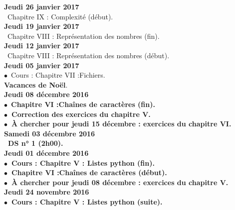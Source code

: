 \documentclass[12pt,a4paper]{article}
\begin{document}
\noindent\textbf{\bf Jeudi 26 janvier 2017 \rm}\\
\bu\ Chapitre IX : Complexité (début).\vspace{.4cm}\\

\noindent\textbf{\bf Jeudi 19 janvier 2017 \rm}\\
\bu\ Chapitre VIII : Représentation des nombres (fin).\vspace{.4cm}\\

\noindent\textbf{\bf Jeudi 12 janvier 2017 \rm}\\
\bu\ Chapitre VIII : Représentation des nombres (début).\vspace{.4cm}\\

\noindent\textbf{\bf Jeudi 05 janvier 2017 \rm}\\
$\bullet$\ Cours : Chapitre VII :\rm Fichiers.\vspace{.4cm}\\
 
\noindent\textbf{\bf Vacances de Noël}.\vspace{.4cm}\\

\noindent\textbf{\bf Jeudi 08 décembre 2016 \rm}\\
$\bullet$\ \bf Chapitre VI :\rm Chaînes de caractères (fin).\\
$\bullet$\ Correction des exercices du chapitre V.\\
$\bullet$\ À chercher pour jeudi 15 décembre : exercices du chapitre VI.
\vspace{.4cm}\\
  
\noindent\textbf{\bf Samedi 03 décembre 2016 \rm}\\
\bu\ DS n° 1 (2h00).\vspace{.4cm}\\

\noindent\textbf{\bf Jeudi 01 décembre 2016 \rm}\\
$\bullet$\ Cours : \bf Chapitre V \rm : Listes python (fin).\\
$\bullet$\ \bf Chapitre VI :\rm Chaînes de caractères (début).\\
$\bullet$\ À chercher pour jeudi 08 décembre : exercices du chapitre V.\vspace{.4cm}\\

\noindent\textbf{\bf Jeudi 24 novembre 2016 \rm}\\
$\bullet$\ Cours : \bf Chapitre V \rm : Listes python (suite).\vspace{.4cm}\\
\end{document}
